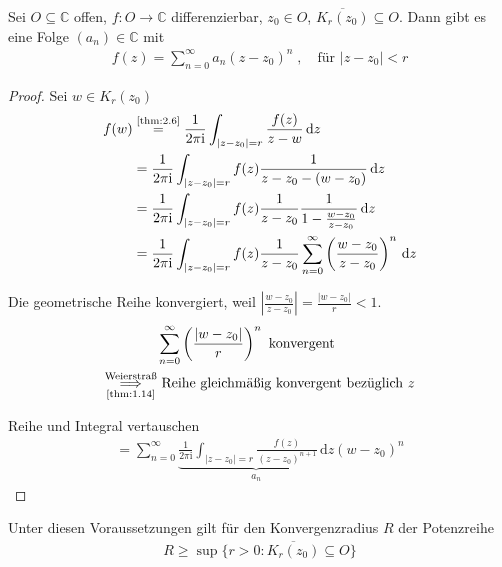\documentclass[a4paper,10pt]{scrbook}
\begin{document}
\begin{theorem}[Potenzreihenentwicklungssatz] \label{thm:2.7}
  Sei $O \subseteq \mathbb{C}$ offen, $f : O \to \mathbb{C}$ differenzierbar, $z_0 \in O$, $\overline{K_r(z_0)} \subseteq O$. Dann gibt es eine Folge $(a_n) \in \mathbb{C}$ mit
  \begin{align*}
    f(z) = \sum\limits_{n=0}^{\infty} a_n (z-z_0)^n \; , \quad \text{für } |z-z_0| < r
  \end{align*}

  \begin{proof}
    Sei $w \in K_r(z_0)$
    \begin{align*}
      f(w) &\overset{\text{\ref{thm:2.6}}}{=} \frac{1}{2 \pi \mathrm{i}} \int_{|z-z_0| = r} \frac{f(z)}{z-w} \, \mathrm{d}z \\
      &= \frac{1}{2 \pi \mathrm{i}} \int_{|z-z_0| = r} f(z) \frac{1}{z-z_0-(w-z_0)} \, \mathrm{d}z \\
      &= \frac{1}{2 \pi \mathrm{i}} \int_{|z-z_0| = r} f(z) \frac{1}{z-z_0} \frac{1}{1-\frac{w-z_0}{z-z_0}} \, \mathrm{d}z \\
      &= \frac{1}{2 \pi \mathrm{i}} \int_{|z-z_0| = r} f(z) \frac{1}{z-z_0} \sum\limits_{n=0}^{\infty} \left( \frac{w-z_0}{z-z_0} \right)^n \, \mathrm{d}z
    \end{align*}
    \begin{notice*}
      Die geometrische Reihe konvergiert, weil $\left| \frac{w-z_0}{z-z_0} \right| = \frac{|w-z_0|}{r} < 1$.
      \begin{align*}
        &\sum\limits_{n=0}^{\infty} \left(\frac{|w-z_0|}{r}\right)^n \text{ konvergent } \\
        \overset{\text{Weierstraß}}{\underset{\text{\ref{thm:1.14}}}{\implies}}
        &\text{ Reihe gleichmäßig konvergent bezüglich $z$}
      \end{align*}
    \end{notice*}
    Reihe und Integral vertauschen
    \begin{align*}
      = \sum\limits_{n=0}^{\infty} \underbrace{\frac{1}{2 \pi \mathrm{i}} \int_{|z-z_0| = r} \frac{f(z)}{(z-z_0)^{n+1}} \, \mathrm{d}z}_{a_n} \left( w-z_0 \right)^n
    \end{align*}
  \end{proof}
\end{theorem}

\begin{notice}[Folgerung]
  Unter diesen Voraussetzungen gilt für den Konvergenzradius $R$ der Potenzreihe
  \begin{align*}
    R \geq \sup \{ r > 0 : \overline{K_r(z_0)} \subseteq O \}
  \end{align*}
\end{notice}
\end{document}
